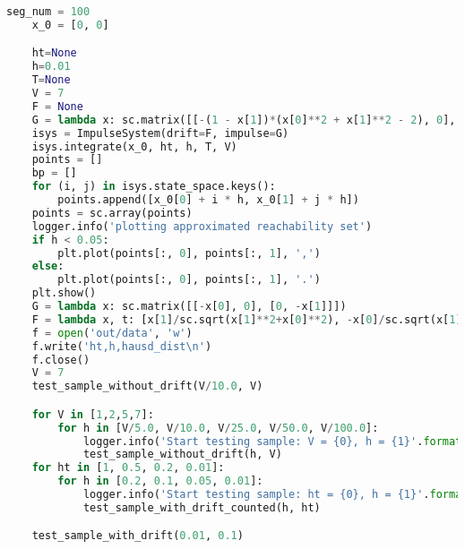 \begin{lstlisting}[language=Python,
caption={Интерфейс Impulse System}]
    seg_num = 100
    x_0 = [0, 0]

    ht=None
    h=0.01
    T=None
    V = 7
    F = None
    G = lambda x: sc.matrix([[-(1 - x[1])*(x[0]**2 + x[1]**2 - 2), 0], [0, -(1 - x[0])*(x[0]**2 + x[1]**2 - 2)]])
    isys = ImpulseSystem(drift=F, impulse=G)
    isys.integrate(x_0, ht, h, T, V)
    points = []
    bp = []
    for (i, j) in isys.state_space.keys():
        points.append([x_0[0] + i * h, x_0[1] + j * h])
    points = sc.array(points)
    logger.info('plotting approximated reachability set')
    if h < 0.05:
        plt.plot(points[:, 0], points[:, 1], ',')
    else:
        plt.plot(points[:, 0], points[:, 1], '.')
    plt.show()
    G = lambda x: sc.matrix([[-x[0], 0], [0, -x[1]]])
    F = lambda x, t: [x[1]/sc.sqrt(x[1]**2+x[0]**2), -x[0]/sc.sqrt(x[1]**2+x[0]**2)]
    f = open('out/data', 'w')
    f.write('ht,h,hausd_dist\n')
    f.close()
    V = 7
    test_sample_without_drift(V/10.0, V)

    for V in [1,2,5,7]:
        for h in [V/5.0, V/10.0, V/25.0, V/50.0, V/100.0]:
            logger.info('Start testing sample: V = {0}, h = {1}'.format(V, h))
            test_sample_without_drift(h, V)
    for ht in [1, 0.5, 0.2, 0.01]:
        for h in [0.2, 0.1, 0.05, 0.01]:
            logger.info('Start testing sample: ht = {0}, h = {1}'.format(ht, h))
            test_sample_with_drift_counted(h, ht)

    test_sample_with_drift(0.01, 0.1)

\end{lstlisting}
  



